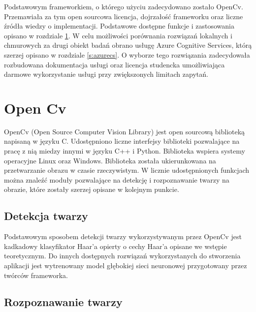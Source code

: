 Podstawowym frameworkiem, o którego użyciu zadecydowano zostało OpenCv. Przemawiała za tym open sourcowa licencja, dojrzałość frameworku oraz liczne źródła wiedzy o implementacji. Podstawowe dostępne funkcje i zastosowania opisano w rozdziale \ref{s:open_cv}.
W celu możliwości porównania rozwiązań lokalnych i chmurowych za drugi obiekt badań obrano usługę Azure Cognitive Services, którą szerzej opisano w rozdziale \ref{s:azurecs}. O wyborze tego rozwiązania zadecydowała rozbudowana dokumentacja usługi oraz licencja studencka umożliwiająca darmowe wykorzystanie usługi przy zwiększonych limitach zapytań.

\section{Open Cv} \label{s:open_cv}
OpenCv (Open Source Computer Vision Library) jest open sourcową biblioteką napisaną w języku C. Udostępniono liczne interfejsy biblioteki pozwalające na pracę z nią miedzy innymi w języku C++ i Python. Biblioteka wspiera systemy operacyjne Linux oraz Windows. Biblioteka została ukierunkowana na przetwarzanie obrazu w czasie rzeczywistym. W licznie udostępnionych funkcjach można znaleźć moduły pozwalające na detekcję i rozpoznawanie twarzy na obrazie, które zostały szerzej opisane w kolejnym punkcie.

\subsection{Detekcja twarzy}
Podstawowym sposobem detekcji twarzy wykorzystywanym przez OpenCv jest kadkadowy klasyfikator Haar'a opierty o cechy Haar'a opisane we wstępie teoretycznym. Do innych dostępnych rozwiązań wykorzystanych do stworzenia aplikacji jest wytrenowany model głębokiej sieci neuronowej przygotowany przez twórców frameworka.

\subsection{Rozpoznawanie twarzy}
